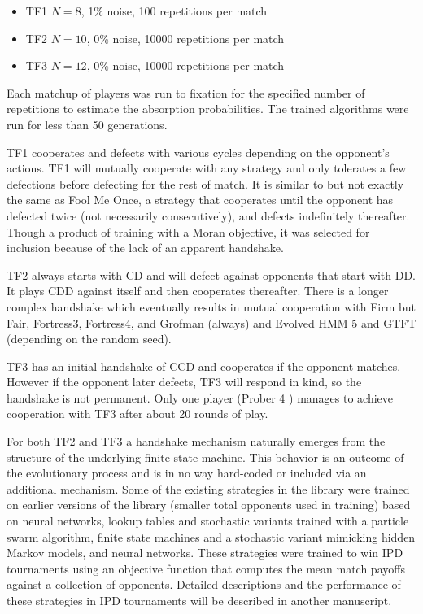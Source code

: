 \documentclass{article}
\begin{document}
\begin{itemize}
	\item TF1 \(N=8\), 1\% noise, 100 repetitions per match
	\item TF2 \(N=10\), 0\% noise, 10000 repetitions per match
	\item TF3 \(N=12\), 0\% noise, 10000 repetitions per match
\end{itemize}

Each matchup of players was run to fixation for the specified number of
repetitions to estimate the absorption probabilities. The trained algorithms
were run for less than 50 generations.

TF1 cooperates and defects with
various cycles depending on the opponent's actions. TF1 will mutually
cooperate with any strategy and only tolerates a few defections before
defecting for the rest of match. It is similar to but not exactly the same as
Fool Me Once, a strategy that cooperates until the opponent has defected twice
(not necessarily consecutively), and defects indefinitely thereafter. Though a
product of training with a Moran objective, it was selected for inclusion
because of the lack of an apparent handshake.

TF2 always starts
with CD and will defect against opponents that start with DD. It plays CDD
against itself and then cooperates thereafter. There is a longer complex
handshake which eventually results in mutual cooperation with Firm but Fair,
Fortress3, Fortress4, and Grofman (always) and Evolved HMM 5 and GTFT
(depending on the random seed).

TF3 has an initial handshake of CCD and cooperates if the opponent matches.
However if the opponent later defects, TF3 will respond in kind, so the
handshake is not permanent. Only one player (Prober 4 \cite{prison}) manages to
achieve cooperation with TF3 after about 20 rounds of play.


For both TF2 and TF3 a handshake
mechanism naturally emerges from the structure of the underlying finite state
machine. This behavior is an outcome of the evolutionary process and is in no
way hard-coded or included via an additional mechanism. Some of the existing
strategies in the library were trained on earlier versions of the library
(smaller total opponents used in training) based on neural networks, lookup
tables and stochastic variants trained with a particle swarm algorithm, finite
state machines and a stochastic variant mimicking hidden Markov models, and
neural networks. These strategies were trained to win IPD tournaments using an
objective function that computes the mean match payoffs against a collection of
opponents. Detailed descriptions and the performance of these strategies in IPD
tournaments will be described in another manuscript.
\end{document}

